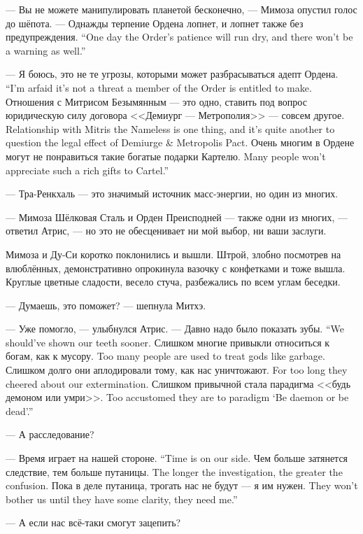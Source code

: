 --- Вы не можете манипулировать планетой бесконечно, --- Мимоза опустил голос до шёпота.
{--- Однажды терпение Ордена лопнет, и лопнет также без предупреждения.}
{``One day the Order's patience will run dry, and there won't be a warning as well.''}

{--- Я боюсь, это не те угрозы, которыми может разбрасываться адепт Ордена.}
{``I'm arfaid it's not a threat a member of the Order is entitled to make.}
{Отношения с Митрисом Безымянным --- это одно, ставить под вопрос юридическую силу договора <<Демиург --- Метрополия>> --- совсем другое.}
{Relationship with Mitris the Nameless is one thing, and it's quite another to question the legal effect of Demiurge \& Metropolis Pact.}
{Очень многим в Ордене могут не понравиться такие богатые подарки Картелю.}
{Many people won't appreciate such a rich gifts to Cartel.''}

--- Тра-Ренкхаль --- это значимый источник масс-энергии, но один из многих.

--- Мимоза Шёлковая Сталь и Орден Преисподней --- также одни из многих, --- ответил Атрис, --- но это не обесценивает ни мой выбор, ни ваши заслуги.

Мимоза и Ду-Си коротко поклонились и вышли.
Штрой, злобно посмотрев на влюблённых, демонстративно опрокинула вазочку с конфетками и тоже вышла.
Круглые цветные сладости, весело стуча, разбежались по всем углам беседки.

--- Думаешь, это поможет? --- шепнула Митхэ.

--- Уже помогло, --- улыбнулся Атрис.
{--- Давно надо было показать зубы.}
{``We should've shown our teeth sooner.}
{Слишком многие привыкли относиться к богам, как к мусору.}
{Too many people are used to treat gods like garbage.}
{Слишком долго они аплодировали тому, как нас уничтожают.}
{For too long they cheered about our extermination.}
{Слишком привычной стала парадигма <<будь демоном или умри>>.}
{Too accustomed they are to paradigm `Be daemon or be dead'.''}

--- А расследование?

{--- Время играет на нашей стороне.}
{``Time is on our side.}
{Чем больше затянется следствие, тем больше путаницы.}
{The longer the investigation, the greater the confusion.}
{Пока в деле путаница, трогать нас не будут --- я им нужен.}
{They won't bother us until they have some clarity, they need me.''}

--- А если нас всё-таки смогут зацепить?

